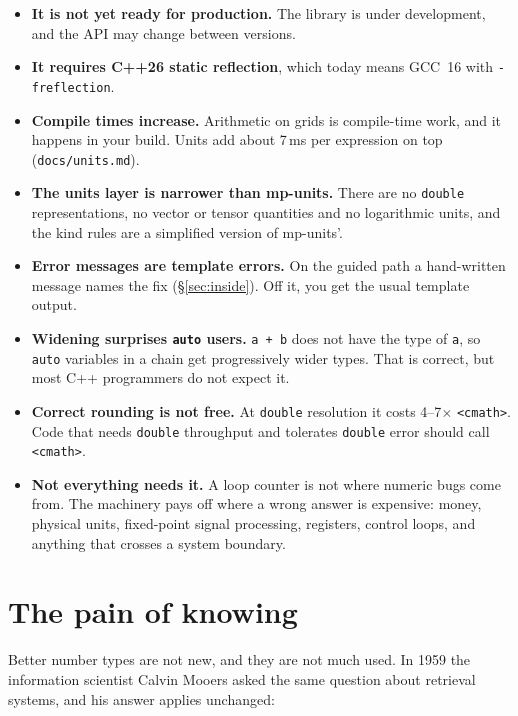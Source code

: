 \documentclass[11pt,a4paper]{article}
\newcommand{\code}[1]{\texttt{\small #1}}
\newcommand{\file}[1]{\texttt{\small #1}}
\begin{document}
\begin{itemize}
\item \textbf{It is not yet ready for production.} The library is under
      development, and the API may change between versions.
\item \textbf{It requires C++26 static reflection}, which today means
      GCC~16 with \code{-freflection}.
\item \textbf{Compile times increase.} Arithmetic on grids is compile-time
      work, and it happens in your build. Units add about 7\,ms per
      expression on top (\file{docs/units.md}).
\item \textbf{The units layer is narrower than mp-units.} There are no
      \code{double} representations, no vector or tensor quantities and no
      logarithmic units, and the kind rules are a simplified version of
      mp-units'.
\item \textbf{Error messages are template errors.} On the guided path a
      hand-written message names the fix (\S\ref{sec:inside}). Off it, you get
      the usual template output.
\item \textbf{Widening surprises \code{auto} users.} \code{a + b} does not
      have the type of \code{a}, so \code{auto} variables in a chain get
      progressively wider types. That is correct, but most C++ programmers do
      not expect it.
\item \textbf{Correct rounding is not free.} At \code{double} resolution it
      costs 4--7$\times$ \code{<cmath>}. Code that needs \code{double}
      throughput and tolerates \code{double} error should call \code{<cmath>}.
\item \textbf{Not everything needs it.} A loop counter is not where numeric
      bugs come from. The machinery pays off where a wrong answer is expensive:
      money, physical units, fixed-point signal processing, registers, control
      loops, and anything that crosses a system boundary.
\end{itemize}

\section{The pain of knowing}\label{sec:adoption}

Better number types are not new, and they are not much used. In 1959 the
information scientist Calvin Mooers asked the same question about retrieval
systems, and his answer applies unchanged:
\end{document}
